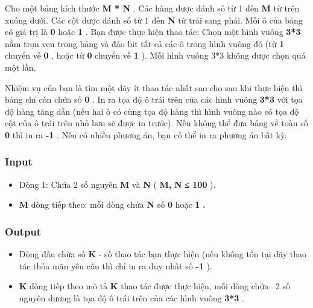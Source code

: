 







   Cho một bảng kích thước   \textbf{    M * N   }   . Các hàng được đánh số từ 1 đến   \textbf{    M   }   từ trên xuống dưới. Các cột được đánh số từ 1 đến   \textbf{    N   }   từ trái sang phải. Mỗi ô của bảng có giá trị là   \textbf{    0   }   hoặc   \textbf{    1   }   . Bạn được thực hiện thao tác: Chọn một hình vuông   \textbf{    3*3   }   nằm trọn vẹn trong bảng và đảo bit tất cả các ô trong hình vuông đó (từ   \textbf{    1   }   chuyển về   \textbf{    0   }   , hoặc từ   \textbf{    0   }   chuyển về   \textbf{    1   }   ). Mỗi hình vuông 3*3 không được chọn quá một lần.  

   Nhiệm vụ của bạn là tìm một dãy ít thao tác nhất sao cho sau khi thực hiện thì bảng chỉ còn chứa số   \textbf{    0   }   . In ra tọa độ ô trái trên của các hình vuông   \textbf{    3*3   }   với tọa độ hàng tăng dần (nếu hai ô có cùng tọa độ hàng thì hình vuông nào có tọa độ cột của ô trái trên nhỏ hơn sẽ được in trước). Nếu không thể đưa bảng về toàn số   \textbf{    0   }   thì in ra   \textbf{    -1   }   . Nếu có nhiều phương án, bạn có thể in ra phương án bất kỳ.  

\subsubsection{    Input   }
\begin{itemize}
	\item     Dòng 1: Chứa 2 số nguyên    \textbf{     M    }    và    \textbf{     N    }    (    \textbf{     M,    }\textbf{     N    }\textbf{     ≤ 100    }    ).   
	\item \textbf{     M    }    dòng tiếp theo: mỗi dòng chứa    \textbf{     N    }    số    \textbf{     0    }    hoặc    \textbf{     1    }\textbf{     .    }
\end{itemize}

\subsubsection{    Output   }
\begin{itemize}
	\item     Dòng đầu chứa số    \textbf{     K    }    - số thao tác bạn thực hiện (nếu không tồn tại dãy thao tác thỏa mãn yêu cầu thì chỉ in ra duy nhất số    \textbf{     -1    }    ).   
	\item \textbf{     K    }    dòng tiếp theo mô tả    \textbf{     K    }    thao tác được thực hiện, mỗi dòng chứa  2 số nguyên dương là tọa độ ô trái trên của các hình vuông    \textbf{     3*3    }    .   
\end{itemize}

